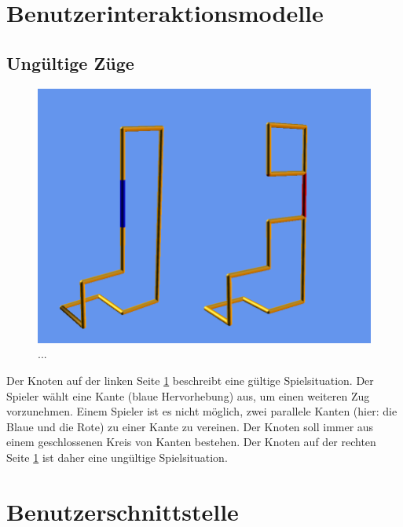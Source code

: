 \section{Benutzerinteraktionsmodelle}

	\begin{figure}[htbp]
	  \centering
	  
	\end{figure}
	
\subsection{Ungültige Züge}

	\begin{figure}[htb]
	  \centering
	  \includegraphics[width = \textwidth]{Systemmodelle/Ungueltiger_Zug.png}
	  \caption{...}
	  \label{fig:zug1}
	\end{figure}

Der Knoten auf der linken Seite \ref{fig:zug1} beschreibt eine gültige Spielsituation. Der Spieler wählt eine Kante (blaue Hervorhebung) aus, um einen weiteren Zug vorzunehmen.
Einem Spieler ist es nicht möglich, zwei parallele Kanten (hier: die Blaue und die Rote) zu einer Kante zu vereinen. Der Knoten soll immer aus einem geschlossenen Kreis von Kanten bestehen. Der Knoten auf der rechten Seite \ref{fig:zug1} ist daher eine ungültige Spielsituation.



\section{Benutzerschnittstelle}

%	  
%
%	  
